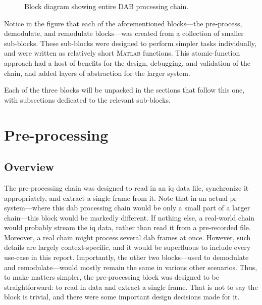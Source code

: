 \documentclass[class=report,11pt,crop=false]{standalone}
\begin{document}
\begin{figure}[htbp]
  \centering
  \captionsetup{type=figure}
  \def\svgwidth{\linewidth}
  { %
      }
  \caption{Block diagram showing entire DAB processing chain.}
  \label{fig:BD_Overview_All}
\end{figure}

Notice in the figure that each of the aforementioned blocks---the pre-process, demodulate, and remodulate blocks---was created from a collection of smaller sub-blocks. These sub-blocks were designed to perform simpler tasks individually, and were written as relatively short \textsc{Matlab} functions. This atomic-function approach had a host of benefits for the design, debugging, and validation of the chain, and added layers of abstraction for the larger system.

Each of the three blocks will be unpacked in the sections that follow this one, with subsections dedicated to the relevant sub-blocks.

\section{Pre-processing \label{sect:dab-proc_preprocessing}}
\subsection{Overview}
The pre-processing chain was designed to read in an \gls{iq} data file, synchronize it appropriately, and extract a single frame from it. Note that in an actual \gls{pr} system---where this \gls{dab} processing chain would be only a small part of a larger chain---this block would be markedly different. If nothing else, a real-world chain would probably stream the \gls{iq} data, rather than read it from a pre-recorded file. Moreover, a real chain might process several \gls{dab} frames at once. However, such details are largely context-specific, and it would be superfluous to include every use-case in this report. Importantly, the other two blocks---used to demodulate and remodulate---would mostly remain the same in various other scenarios. Thus, to make matters simpler, the pre-processing block was designed to be straightforward: to read in data and extract a single frame. That is not to say the block is trivial, and there were some important design decisions made for it.
\end{document}
